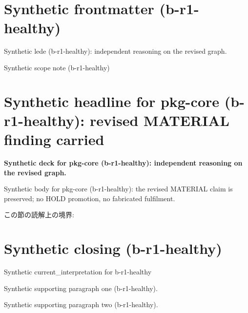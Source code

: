 \documentclass[lualatex,a4paper,10pt]{jlreq}
\begin{document}
\surveycover
\clearpage
\section*{Synthetic frontmatter (b-r1-healthy)}
Synthetic lede (b-r1-healthy): independent reasoning on the revised graph.

\begin{claimboundary}
\noindent Synthetic scope note (b-r1-healthy)\par
\end{claimboundary}
\clearpage
\twocolumn
\section{Synthetic headline for pkg-core (b-r1-healthy): revised MATERIAL finding carried}
\label{pkg:pkg-core}
\noindent\textbf{Synthetic deck for pkg-core (b-r1-healthy): independent reasoning on the revised graph.} \cite{w2026-W33target-source}\par\medskip
\noindent Synthetic body for pkg-core (b-r1-healthy): the revised MATERIAL claim is preserved; no HOLD promotion, no fabricated fulfilment.\par\medskip
\begin{claimboundary}
この節の読解上の境界: 
\end{claimboundary}
\clearpage
\onecolumn
\section{Synthetic closing (b-r1-healthy)}
\label{sec:issue-summary}
\noindent Synthetic current\_interpretation for b-r1-healthy\par\medskip
\noindent Synthetic supporting paragraph one (b-r1-healthy).\par\medskip
\noindent Synthetic supporting paragraph two (b-r1-healthy).\par\medskip
\clearpage
\onecolumn
\printbibliography[title={References / Source Notes}]
\end{document}
